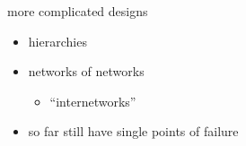 
\begin{frame}{more complicated designs}
    \begin{itemize}
    \item hierarchies
    \item networks of networks
        \begin{itemize}
        \item ``internetworks''
        \end{itemize}
    \item so far still have single points of failure
    \end{itemize}
\end{frame}

